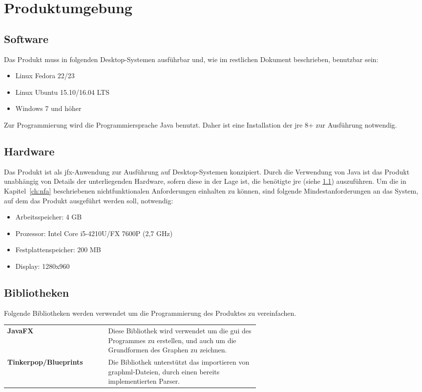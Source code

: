 \chapter{Produktumgebung}
\label{ch:umgebung}

\section{Software}\label{sec:software}
Das Produkt muss in folgenden Desktop-Systemen ausführbar und, wie im restlichen Dokument beschrieben, benutzbar sein:
\begin{itemize}
  \setlength\itemsep{0em}
  \item Linux Fedora 22/23 %
  \item Linux Ubuntu 15.10/16.04 LTS
  \item Windows 7 und höher
\end{itemize}
Zur Programmierung wird die Programmiersprache Java benutzt. Daher ist eine Installation der \gls{jre} 8+ zur Ausführung notwendig.

\section{Hardware}
Das Produkt ist als \gls{jfx}-Anwendung zur Ausführung auf Desktop-Systemen konzipiert.
Durch die Verwendung von Java ist das Produkt unabhängig von Details der unterliegenden Hardware, sofern diese in der Lage ist, die benötigte \gls{jre} (siehe \ref{sec:software}) auszuführen.
Um die in Kapitel~\ref{ch:nfa} beschriebenen nichtfunktionalen Anforderungen einhalten zu können, sind folgende Mindestanforderungen an das System, auf dem das Produkt ausgeführt werden soll, notwendig:

\begin{itemize}
  \setlength\itemsep{0em}
  \item Arbeitsspeicher: 4 GB
  \item Prozessor: Intel Core i5-4210U/FX 7600P (2,7 GHz)
  \item Festplattenspeicher: 200 MB 
  \item Display: 1280x960
\end{itemize}

\section{Bibliotheken}
Folgende Bibliotheken werden verwendet um die Programmierung des Produktes zu vereinfachen. \\

\begin{tabular}{ >{\bfseries}l p{0.6 \linewidth}}
  JavaFX & Diese Bibliothek wird verwendet um die \gls{gui} des Programmes zu erstellen, und auch um die Grundformen des Graphen zu zeichnen. \\
  Tinkerpop/Blueprints & Die Bibliothek unterstützt das importieren von \gls{graphml}-Dateien, durch einen bereits implementierten Parser. \\
\end{tabular}
